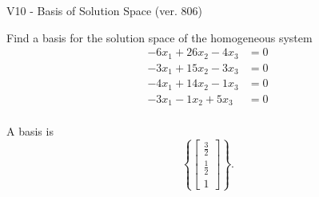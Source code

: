 \begin{exercise}
  \begin{exerciseTitle}V10 - Basis of Solution Space (ver. 806)\end{exerciseTitle}
  \begin{exerciseStatement}
    Find a basis for the solution space of the homogeneous system 
\begin{align*}
 -6 x_ 1 + 26 x_ 2 -4 x_ 3 &= 0  \\ 
  -3 x_ 1 + 15 x_ 2 -3 x_ 3 &= 0  \\ 
  -4 x_ 1 + 14 x_ 2 -1 x_ 3 &= 0  \\ 
  -3 x_ 1 -1 x_ 2 + 5 x_ 3 &= 0  \\ 
 \end{align*}


 
  \end{exerciseStatement}

  \begin{exerciseAnswer}
   A basis is   
\[\left\{\left[\begin{array}{c}
\frac{3}{2} \\
\frac{1}{2} \\
1
\end{array}\right]\right\}.\]

  


  \end{exerciseAnswer}
\end{exercise}
